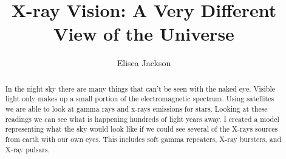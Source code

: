 \documentclass[final,8p,times,twocolumn,authoryear]{elsarticle}
\begin{document}
\begin{frontmatter}



\title {X-ray Vision: A Very Different View of the Universe}


\author[first]{Elisea Jackson}

\begin{abstract}
In the night sky there are many things that can’t be seen with the naked eye. Visible light only makes up a small portion of the electromagnetic spectrum. Using satellites we are able to look at gamma rays and x-rays emissions for stars. Looking at these readings we can see what is happening hundreds of light years away. I created a model representing what the sky would look like if we could see several of the X-rays sources from earth with our own eyes. This includes soft gamma repeaters, X-ray bursters, and X-ray pulsars.

\end{abstract}


\end{frontmatter}
\end{document}

